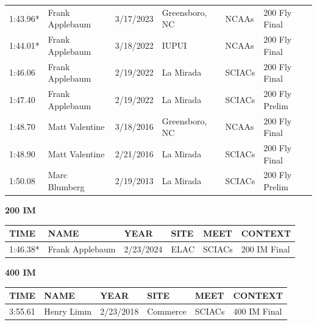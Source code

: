 \begin{table}[H]
\begin{minipage}[t]{0.48\textwidth}
\begin{tabular}{@{}p{1.8cm}p{2.8cm}p{1.2cm}p{1.4cm}p{1.4cm}p{2.0cm}@{}}
    1:43.96* & Frank Applebaum & 3/17/2023 & Greensboro, NC & NCAAs & 200 Fly Final \\
    1:44.01* & Frank Applebaum & 3/18/2022 & IUPUI & NCAAs & 200 Fly Final \\
    1:46.06 & Frank Applebaum & 2/19/2022 & La Mirada & SCIACs & 200 Fly Final \\
    1:47.40 & Frank Applebaum & 2/19/2022 & La Mirada & SCIACs & 200 Fly Prelim \\
    1:48.70 & Matt Valentine & 3/18/2016 & Greensboro, NC & NCAAs & 200 Fly Final \\
    1:48.90 & Matt Valentine & 2/21/2016 & La Mirada & SCIACs & 200 Fly Final \\
    1:50.08 & Marc Blumberg & 2/19/2013 & La Mirada & SCIACs & 200 Fly Prelim \\
\hline
\end{tabular}
\end{minipage}
\end{table}

\begin{table}[H]
\centering
\begin{minipage}[t]{0.48\textwidth}
\centering
\textbf{200 IM}\\[0.1cm]
\begin{tabular}{@{}p{1.8cm}p{2.8cm}p{1.2cm}p{1.4cm}p{1.4cm}p{2.0cm}@{}}
\hline
    \textbf{TIME} & \textbf{NAME} & \textbf{YEAR} & \textbf{SITE} & \textbf{MEET} & \textbf{CONTEXT} \\
\hline
    1:46.38* & Frank Applebaum & 2/23/2024 & ELAC & SCIACs & 200 IM Final \\
\hline
\end{tabular}
\end{minipage}\hfill
\begin{minipage}[t]{0.48\textwidth}
\centering
\textbf{400 IM}\\[0.1cm]
\begin{tabular}{@{}p{1.8cm}p{2.8cm}p{1.2cm}p{1.4cm}p{1.4cm}p{2.0cm}@{}}
\hline
    \textbf{TIME} & \textbf{NAME} & \textbf{YEAR} & \textbf{SITE} & \textbf{MEET} & \textbf{CONTEXT} \\
\hline
    3:55.61 & Henry Limm & 2/23/2018 & Commerce & SCIACs & 400 IM Final \\
\hline
\end{tabular}
\end{minipage}
\end{table}

